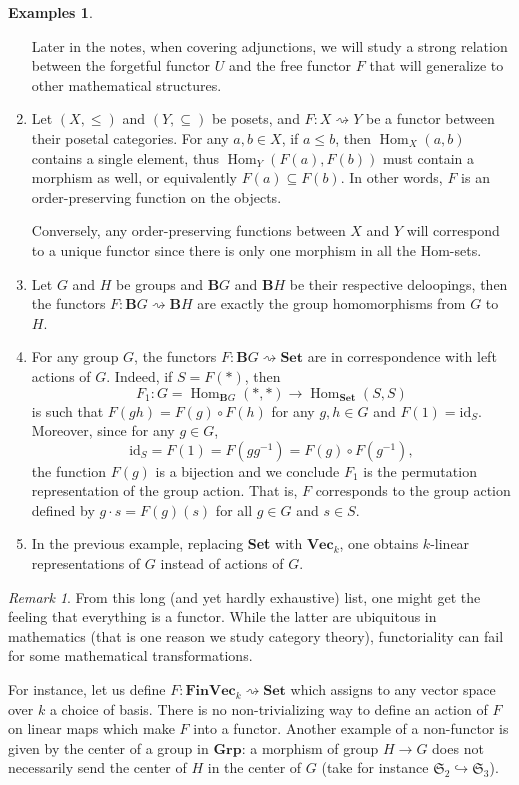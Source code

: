 \documentclass{article}
\theoremstyle{definition}
\newtheorem{exmps}[thm]{Examples}
\theoremstyle{remark}
\newtheorem{rem}[thm]{Remark}
\DeclareMathOperator{\Hom}{Hom}
\newcommand{\id}{\text{id}}
\begin{document}
\begin{exmps}
\begin{enumerate}
		Later in the notes, when covering adjunctions, we will study a strong relation between the forgetful functor $U$ and the free functor $F$ that will generalize to other mathematical structures.
		
		\item Let $(X, \leq)$ and $(Y, \subseteq)$ be posets, and $F:X\rightsquigarrow Y$ be a functor between their posetal categories. For any $a, b \in X$, if $a\leq b$, then $\Hom_X(a,b)$ contains a single element, thus $\Hom_Y(F(a), F(b))$ must contain a morphism as well, or equivalently $F(a) \subseteq F(b)$. In other words, $F$ is an order-preserving function on the objects.
		
		Conversely, any order-preserving functions between $X$ and $Y$ will correspond to a unique functor since there is only one morphism in all the Hom-sets.
				
		\item Let $G$ and $H$ be groups and $\mathbf{B}G$ and $\mathbf{B}H$ be their respective deloopings, then the functors $F: \mathbf{B}G \rightsquigarrow \mathbf{B}H$ are exactly the group homomorphisms from $G$ to $H$.
		
		\item For any group $G$, the functors $F:\mathbf{B}G \rightsquigarrow \textbf{Set}$ are in correspondence with left actions of $G$. Indeed, if $S = F(\ast)$, then \[F_1: G = \Hom_{\mathbf{B}G}(\ast, \ast) \rightarrow \Hom_{\textbf{Set}}(S, S)\]
		is such that $F(gh) = F(g) \circ F(h)$ for any $g,h \in G$ and $F(1) = \id_S$. Moreover, since for any $g \in G$,
		\[\id_S = F(1) = F(gg^{-1}) = F(g) \circ F(g^{-1}),\]
		the function $F(g)$ is a bijection and we conclude $F_1$ is the permutation representation of the group action. That is, $F$ corresponds to the group action defined by $g \cdot s = F(g)(s)$ for all $g \in G$ and $s \in S$.
		
		\item In the previous example, replacing \textbf{Set} with $\textbf{Vec}_k$, one obtains $k$-linear representations of $G$ instead of actions of $G$. 
	\end{enumerate}
\end{exmps}
\begin{rem}
    From this long (and yet hardly exhaustive) list, one might get the feeling that everything is a functor. While the latter are ubiquitous in mathematics (that is one reason we study category theory), functoriality can fail for some mathematical transformations.
    
    For instance, let us define $F: \textbf{FinVec}_k \rightsquigarrow \textbf{Set}$ which assigns to any vector space over $k$ a choice of basis. There is no non-trivializing way to define an action of $F$ on linear maps which make $F$ into a functor. Another example of a non-functor is given by the center of a group in $\textbf{Grp}$: a morphism of group $H \to G$ does not necessarily send the center of $H$ in the center of $G$ (take for instance $\mathfrak{S}_2 \hookrightarrow \mathfrak{S}_3$).
\end{rem}
\end{document}
